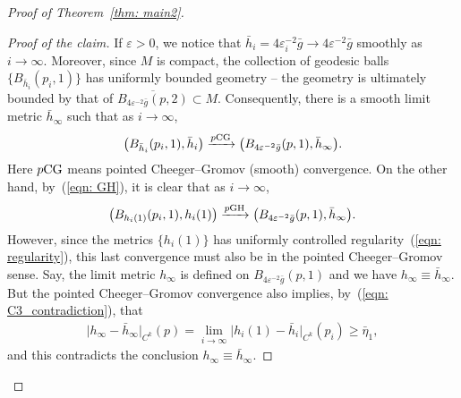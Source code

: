 \documentclass[10pt,a4paper]{amsart}
\numberwithin{equation}{section}
\begin{document}
\begin{proof}[Proof of Theorem~\ref{thm: main2}]
\begin{proof}[Proof of the claim]
If $\varepsilon>0$, we notice that
$\bar{h}_i=4\varepsilon_i^{-2}\bar{g}\to 4\varepsilon^{-2}\bar{g}$ smoothly as
$i\to\infty$. Moreover, since $M$ is compact, the collection of geodesic balls
$ \{B_{\bar{h}_i}(p_i,1) \}$ has uniformly bounded geometry -- the
geometry is ultimately bounded by that of
$\overline{B_{4\varepsilon^{-2}\bar{g}}(p,2)}\subset M$. Consequently, there is
a smooth limit metric $\bar{h}_{\infty}$ such that as $i\to \infty$,
\begin{align*}
\big(B_{\bar{h}_i}(p_i,1),\bar{h}_i\big) \xrightarrow{p{\rm CG}}
\big(B_{4\varepsilon^{-2}\bar{g}}(p,1),\bar{h}_{\infty}\big).
\end{align*}
Here $p{\rm CG}$ means pointed Cheeger--Gromov (smooth) convergence. On the other hand,
by~(\ref{eqn: GH}), it is clear that as $i\to \infty$,
\begin{align*}
\big(B_{h_i(1)}(p_i,1),h_i(1)\big) \xrightarrow{p{\rm GH}}
\big(B_{4\varepsilon^{-2}\bar{g}}(p,1), \bar{h}_{\infty}\big).
\end{align*}
However, since the metrics $\{h_i(1)\}$ has uniformly controlled regularity~(\ref{eqn: regularity}), this last convergence must also be in the pointed
Cheeger--Gromov sense. Say, the limit metric $h_{\infty}$ is defined on
$B_{4\varepsilon^{-2}\bar{g}}(p,1)$ and we have $h_{\infty}\equiv
\bar{h}_{\infty}$. But the pointed Cheeger--Gromov convergence also implies, by~(\ref{eqn: C3_contradiction}), that{\samepage
\begin{align*}
 \big|h_{\infty}-\bar{h}_{\infty} \big|_{C^k}(p) = \lim_{i\to\infty}
 \big|h_i(1)-\bar{h}_i \big|_{C^k}(p_i) \ge \bar{\eta}_1,
\end{align*}
and this contradicts the conclusion $h_{\infty}\equiv \bar{h}_{\infty}$.}


\end{proof}
\end{proof}
\end{document}
